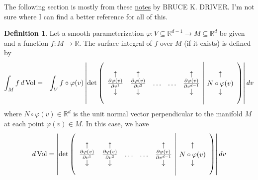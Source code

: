 \documentclass{article}
\theoremstyle{definition}
\renewcommand\det{\operatorname{det}}
\newcommand{\p}{\partial}
\newcommand{\R}{\mathbb{R}}
\newcommand{\f}[2]{\frac{#1}{#2}}
\theoremstyle{theorem}
\newtheorem{definition}[theorem]{Definition}
\newcommand{\Vol}{\operatorname{Vol}}
\begin{document}
The following section is mostly from these  \href{http://www.math.ucsd.edu/~bdriver/231-02-03/Lecture_Notes/pde8.pdf}{\underline{notes}} by BRUCE K. DRIVER. I'm not sure where I can find a better reference for all of this.
\begin{definition}
Let a smooth parameterization $\varphi: V \subseteq \R^{d-1} \to M \subseteq \R^d$ be given and a function $f: M\to \R$. The surface integral of $f$ over $M$ (if it exists) is defined by 
\begin{eqnarray*}
    \int_M f\,d\Vol &=& \int_V f\circ \varphi(v) \, \abs{ \det\left(\begin{array}{ccccc|c}
     & & & & &\\
    \uparrow &\uparrow & & & \uparrow &\uparrow \\ 
    \f{\p \varphi(v)}{\p v^1}& \f{\p \varphi(v)}{\p v^2} & \dots &\dots&\f{\p \varphi(v)}{\p v^{d-1}}& N\circ \varphi(v) \\
    \downarrow  &\downarrow  & & & \downarrow  &\downarrow \\ 
    &&&& & 
    \end{array}\right)
    } \,dv
\end{eqnarray*}
where $N\circ \varphi(v)\in \R^d$ is the unit normal vector perpendicular to the manifold $M$ at each point $\varphi(v)\in M$. In this case, we have
\begin{equation*}
    d\Vol = \abs{ \det\left(\begin{array}{ccccc|c}
     & & & & &\\
    \uparrow &\uparrow & & & \uparrow &\uparrow \\ 
    \f{\p \varphi(v)}{\p v^1}& \f{\p \varphi(v)}{\p v^2} & \dots &\dots&\f{\p \varphi(v)}{\p v^{d-1}}& N\circ \varphi(v) \\
    \downarrow  &\downarrow  & & & \downarrow  &\downarrow \\ 
    &&&& & 
    \end{array}\right)
    } \,dv
\end{equation*}
\end{definition}
\end{document}
